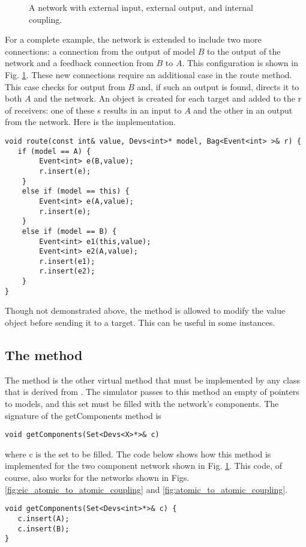 \begin{figure}[ht]
\centering
{}
\caption{A network with external input, external output, and internal coupling.}
\label{fig:big_coupling}
\end{figure} 
For a complete example, the network is extended to include two more connections: a connection from the output of model $B$ to the output of the network and a feedback connection from $B$ to $A$. This configuration is shown in Fig. \ref{fig:big_coupling}. These new connections require an additional case in the route method. This case checks for output from $B$ and, if such an output is found, directs it to both $A$ and the network. An  object is created for each target and added to the  r of receivers: one of these s results in an input to $A$ and the other in an output from the network. Here is the implementation.
\begin{verbatim}
void route(const int& value, Devs<int>* model, Bag<Event<int> >& r) {
   if (model == A) {
        Event<int> e(B,value);
        r.insert(e);
    }
    else if (model == this) {
        Event<int> e(A,value);
        r.insert(e);
    }
    else if (model == B) {
        Event<int> e1(this,value);
        Event<int> e2(A,value);
        r.insert(e1);
        r.insert(e2);
    }
}
\end{verbatim}

Though not demonstrated above, the  method is allowed to modify the value object before sending it to a target. This can be useful in some instances.

\subsection{The  method}
The  method is the other virtual method that must be implemented by any class that is derived from . The simulator passes to this method an empty  of pointers to models, and this set must be filled with the network's components. The signature of the getComponents method is
\begin{verbatim}
void getComponents(Set<Devs<X>*>& c) 
\end{verbatim}
where c is the set to be filled. The code below shows how this method is implemented for the two component network shown in Fig. \ref{fig:big_coupling}. This code, of course, also works for the networks shown in Figs. \ref{fig:eic_atomic_to_atomic_coupling} and \ref{fig:atomic_to_atomic_coupling}.
\begin{verbatim}
void getComponents(Set<Devs<int>*>& c) { 
   c.insert(A);
   c.insert(B);
}
\end{verbatim}

